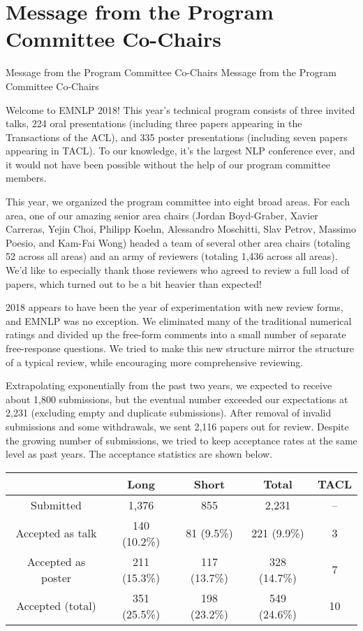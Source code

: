 \section{Message from the Program Committee Co-Chairs}
\setheaders%
    {Message from the Program Committee Co-Chairs}%
    {Message from the Program Committee Co-Chairs}
\thispagestyle{emptyheader}


\setlength{\parskip}{.7ex}


Welcome to EMNLP 2018! This year's technical program consists of three invited talks, 224 oral presentations (including three papers appearing in the Transactions of the ACL), and 335 poster presentations (including seven papers appearing in TACL). To our knowledge, it's the largest NLP conference ever, and it would not have been possible without the help of our program committee members.

This year, we organized the program committee into eight broad areas. For each area, one of our amazing senior area chairs (Jordan Boyd-Graber, Xavier Carreras, Yejin Choi, Philipp Koehn, Alessandro Moschitti, Slav Petrov, Massimo Poesio, and Kam-Fai Wong) headed a team of several other area chairs (totaling 52 across all areas) and an army of reviewers (totaling 1,436 across all areas). We'd like to especially thank those reviewers who agreed to review a full load of papers, which turned out to be a bit heavier than expected!

2018 appears to have been the year of experimentation with new review forms, and EMNLP was no exception. We eliminated many of the traditional numerical ratings and divided up the free-form comments into a small number of separate free-response questions. We tried to make this new structure mirror the structure of a typical review, while encouraging more comprehensive reviewing.

Extrapolating exponentially from the past two years, we expected to receive about 1,800 submissions, but the eventual number exceeded our expectations at 2,231 (excluding empty and duplicate submissions). After removal of invalid submissions and some withdrawals, we sent 2,116 papers out for review. Despite the growing number of submissions, we tried to keep acceptance rates at the same level as past years. The acceptance statistics are shown below.

\begin{table}[h]
    \begin{center}
\begin{tabular}[h]{|c|c|c|c|c|}
\hline
    &Long & Short & Total &TACL \\
\hline
    Submitted & 1,376 & 855 & 2,231 & -- \\
\hline
    Accepted as talk & 140 (10.2\%) &  81 (9.5\%) & 221 (9.9\%) & 3\\
\hline
    Accepted as poster & 211 (15.3\%) & 117 (13.7\%) & 328 (14.7\%) & 7 \\
\hline
    Accepted (total) & 351 (25.5\%) &  198 (23.2\%) & 549 (24.6\%) & 10 \\
\hline
\end{tabular}
    \end{center}
\end{table}

